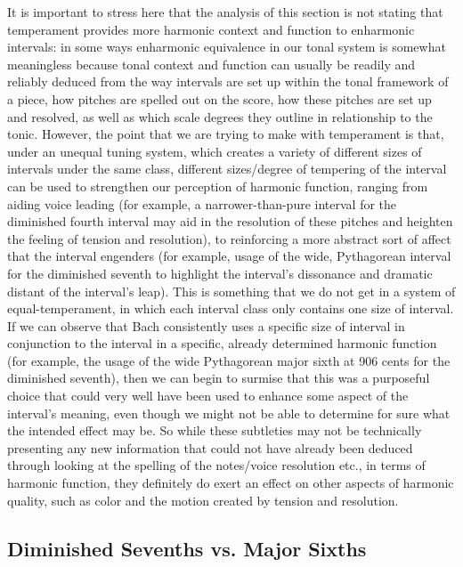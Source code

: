 It is important to stress here that the analysis of this section is not
stating that temperament provides more harmonic context and function to
enharmonic intervals: in some ways enharmonic equivalence in our tonal
system is somewhat meaningless because tonal context and function can
usually be readily and reliably deduced from the way intervals are set
up within the tonal framework of a piece, how pitches are spelled out on
the score, how these pitches are set up and resolved, as well as which
scale degrees they outline in relationship to the tonic. However, the
point that we are trying to make with temperament is that, under an
unequal tuning system, which creates a variety of different sizes of
intervals under the same class, different sizes/degree of tempering of
the interval can be used to strengthen our perception of harmonic
function, ranging from aiding voice leading (for example, a
narrower-than-pure interval for the diminished fourth interval may aid
in the resolution of these pitches and heighten the feeling of tension
and resolution), to reinforcing a more abstract sort of affect that the
interval engenders (for example, usage of the wide, Pythagorean interval
for the diminished seventh to highlight the interval's dissonance and
dramatic distant of the interval's leap). This is something that we do
not get in a system of equal-temperament, in which each interval class
only contains one size of interval. If we can observe that Bach
consistently uses a specific size of interval in conjunction to the
interval in a specific, already determined harmonic function (for
example, the usage of the wide Pythagorean major sixth at 906 cents for
the diminished seventh), then we can begin to surmise that this was a
purposeful choice that could very well have been used to enhance some
aspect of the interval's meaning, even though we might not be able to
determine for sure what the intended effect may be. So while these
subtleties may not be technically presenting any new information that
could not have already been deduced through looking at the spelling of
the notes/voice resolution etc., in terms of harmonic function, they
definitely do exert an effect on other aspects of harmonic quality, such
as color and the motion created by tension and resolution.~

    \subsection{Diminished Sevenths vs. Major
Sixths}\label{diminished-sevenths-vs.-major-sixths}

